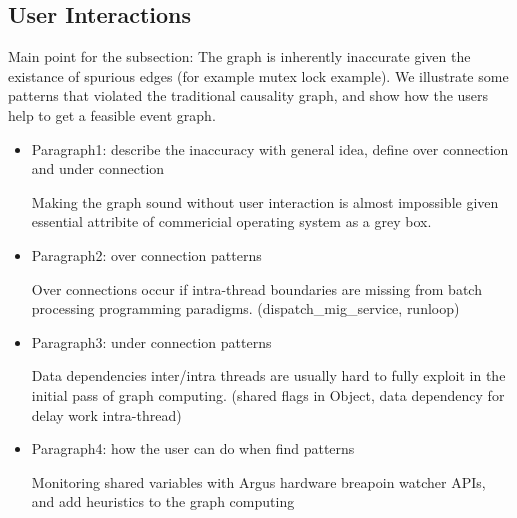 \subsection{User Interactions}

Main point for the subsection: The graph is inherently inaccurate given the
existance of spurious edges (for example mutex lock example). We illustrate some
patterns that violated the traditional causality graph, and show how the users
help to get a feasible event graph.

\begin{itemize}

 	\item Paragraph1: describe the inaccuracy with general idea, define over
connection and under connection

Making the graph sound without user interaction is almost impossible given
essential attribite of commericial operating system as a grey box.
	
	\item Paragraph2: over connection patterns

Over connections occur if intra-thread boundaries are missing from batch
processing programming paradigms. (dispatch\_mig\_service, runloop)

	\item Paragraph3: under connection patterns

Data dependencies inter/intra threads are usually hard to fully exploit in the
initial pass of graph computing. (shared flags in Object, data dependency for
delay work intra-thread)

	\item Paragraph4: how the user can do when find patterns

Monitoring shared variables with Argus hardware breapoin watcher APIs, and add
heuristics to the graph computing

\end{itemize}
